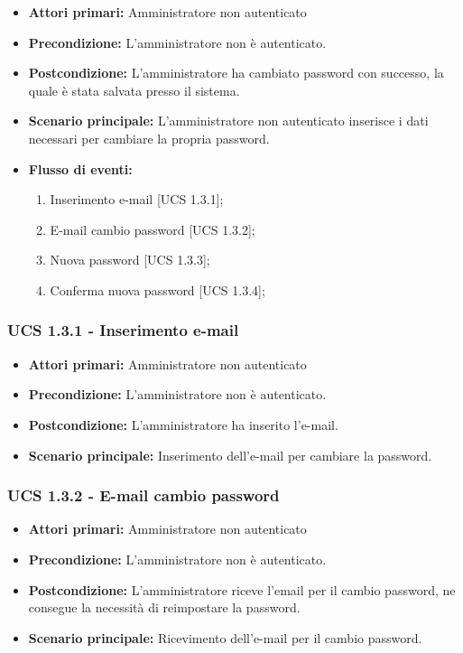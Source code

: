 \begin{itemize}
\item \textbf{Attori primari:} Amministratore non autenticato
\item \textbf{Precondizione:}  L'amministratore non è autenticato.
\item \textbf{Postcondizione:} L'amministratore ha cambiato password con successo, la quale è stata salvata presso il sistema.
\item \textbf{Scenario principale:} L'amministratore non autenticato inserisce i dati necessari per cambiare la propria password.
\item \textbf{Flusso di eventi:}
    \begin{enumerate}
        \item Inserimento e-mail [UCS 1.3.1];
        \item E-mail cambio password [UCS 1.3.2];
        \item Nuova password [UCS 1.3.3];
        \item Conferma nuova password [UCS 1.3.4];
    \end{enumerate}
\end{itemize}

\subsubsection{UCS 1.3.1 - Inserimento e-mail}
\begin{itemize}
\item \textbf{Attori primari:} Amministratore non autenticato
\item \textbf{Precondizione:} L'amministratore non è autenticato. %
\item \textbf{Postcondizione:} L'amministratore ha inserito l'e-mail.
\item \textbf{Scenario principale:} Inserimento dell'e-mail per cambiare la password.
\end{itemize}

\subsubsection{UCS 1.3.2 - E-mail cambio password}
\begin{itemize}
\item \textbf{Attori primari:} Amministratore non autenticato
\item \textbf{Precondizione:} L'amministratore non è autenticato.
\item \textbf{Postcondizione:} L'amministratore riceve l'email per il cambio password, ne consegue la necessità di reimpostare la password.
\item \textbf{Scenario principale:} Ricevimento dell'e-mail per il cambio password.
\end{itemize}

